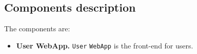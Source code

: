 \subsection{Components description}
\label{subsec:components_description}%
The components are:
\begin{itemize}
    \item \textbf{User WebApp.} \verb|User| \verb|WebApp| is the front-end for users. 


\end{itemize}
